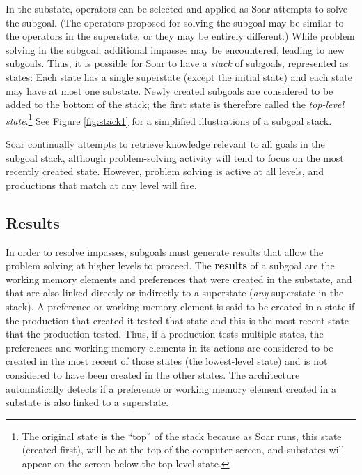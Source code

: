 In the substate, operators can be selected and applied as Soar attempts to solve the subgoal. (The operators proposed for solving the subgoal may be similar to the operators in the superstate, or they may be entirely different.) While problem solving in the subgoal, additional impasses may be encountered, leading to new subgoals.  Thus, it is possible for Soar to have a \emph{stack} of subgoals, represented as states: Each state has  a single superstate (except the initial state) and each state may have at most one substate. Newly created subgoals are considered to be added to the bottom of the stack; the first state is therefore called the \emph{top-level state}.\footnote{
	The original state is the ``top'' of the stack because as Soar runs, this state (created first), will be at the top of the computer screen, and substates will appear on the screen below the top-level state.
} See Figure \ref{fig:stack1} for a simplified illustrations of a subgoal stack.

Soar continually attempts to retrieve knowledge relevant to all goals in the subgoal stack, although problem-solving activity will tend to focus on the most recently created state. However, problem solving is active at all levels, and productions that match at any level will fire.

\subsection{Results}
\label{ARCH-impasses-results}

In order to resolve impasses, subgoals must generate results that allow the problem solving at higher levels to proceed.  The \textbf{results} of a subgoal are the working memory elements and preferences that were created in the substate, and that are also linked directly or indirectly to a superstate (\emph{any} superstate in the stack). A preference or working memory element is said to be created in a state if the production that created it tested that state and this is the most recent state that the production tested. Thus, if a production tests multiple states, the preferences and working memory elements in its actions are considered to be created in the most recent of those states (the lowest-level state) and is not considered to have been created in the other states. The architecture automatically detects if a preference or working memory element created in a substate is also linked to a superstate.

